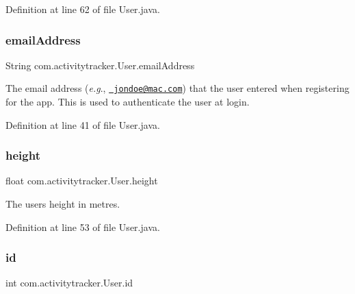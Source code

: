 Definition at line 62 of file User.\+java.

\mbox{\label{classcom_1_1activitytracker_1_1_user_ac2fdb9a858d0295e52c5f8bc179e3137}} 
\subsubsection{\texorpdfstring{emailAddress}{emailAddress}}
{\footnotesize\ttfamily String com.\+activitytracker.\+User.\+email\+Address\hspace{0.3cm}{\ttfamily [private]}}

The email address ({\itshape e.\+g}., \href{mailto:jondoe@mac.com}{\texttt{ jondoe@mac.\+com}}) that the user entered when registering for the app. This is used to authenticate the user at login. 

Definition at line 41 of file User.\+java.

\mbox{\label{classcom_1_1activitytracker_1_1_user_a83cdfe6f520a4e18e8710e8e11f8c3d6}} 
\subsubsection{\texorpdfstring{height}{height}}
{\footnotesize\ttfamily float com.\+activitytracker.\+User.\+height\hspace{0.3cm}{\ttfamily [private]}}

The user\textquotesingle{}s height in metres. 

Definition at line 53 of file User.\+java.

\mbox{\label{classcom_1_1activitytracker_1_1_user_adc05319380c2cbb37477ab5aab86317c}} 
\subsubsection{\texorpdfstring{id}{id}}
{\footnotesize\ttfamily int com.\+activitytracker.\+User.\+id\hspace{0.3cm}{\ttfamily [private]}}

